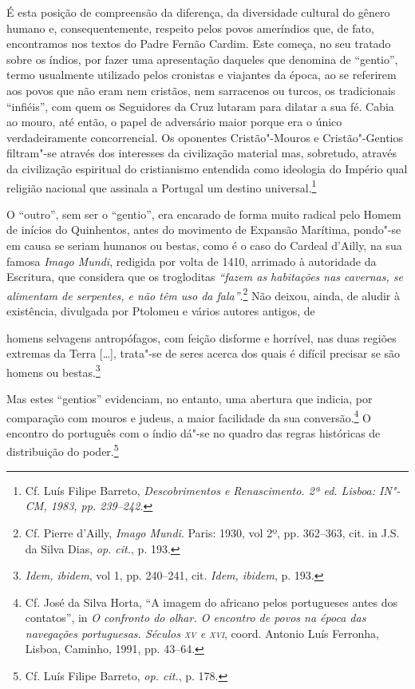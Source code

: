É esta posição de compreensão da diferença, da diversidade cultural
do gênero humano e, consequentemente, respeito pelos povos ameríndios
que, de fato, encontramos nos textos do Padre Fernão Cardim. Este
começa, no seu tratado sobre os índios, por fazer uma
apresentação daqueles que denomina de ``gentio'', termo
usualmente utilizado pelos cronistas e viajantes da época, ao se
referirem aos povos que não eram nem cristãos, nem sarracenos ou
turcos, os tradicionais ``infiéis'', com quem os Seguidores da Cruz
lutaram para dilatar a sua fé. Cabia ao mouro, até então, o papel de
adversário maior porque era o único verdadeiramente concorrencial. Os
oponentes Cristão"-Mouros e Cristão"-Gentios filtram"-se
através dos interesses da civilização material mas, sobretudo, através
da civilização espiritual do cristianismo entendida como ideologia do
Império qual religião nacional que assinala a Portugal um
destino universal.\footnote{ Cf. Luís Filipe Barreto,
\textit{Descobrimentos e Renascimento. 2ª ed. Lisboa: IN"-CM, 1983, pp. 239--242.}} 

 O ``outro'', sem ser o ``gentio'', era encarado de forma muito
radical pelo Homem de inícios do Quinhentos, antes do movimento
de Expansão Marítima, pondo"-se em causa se seriam humanos ou bestas,
como é o caso do Cardeal d'Ailly, na sua famosa \textit{Imago Mundi}, 
redigida por volta de 1410, arrimado à autoridade da Escritura, que 
considera que os trogloditas \textit{``fazem as habitações nas cavernas, se
alimentam de serpentes, e não têm uso da fala''}.\footnote{ Cf. Pierre 
d'Ailly, \textit{Imago Mundi}. Paris: 1930, vol 2º, pp. 362--363, cit. in J.S. da Silva Dias,
\textit{op. cit.}, p. 193.} Não deixou, ainda, de aludir à
existência, divulgada por Ptolomeu e vários autores antigos, de

\begin{hedraquote}
[\ldots{}] homens selvagens antropófagos, com feição disforme e horrível,
nas duas regiões extremas da Terra [\ldots{}], trata"-se de seres acerca dos
quais é difícil precisar se são homens ou bestas.\footnote{ \textit{Idem, ibidem}, 
vol 1, pp. 240--241, cit. \textit{Idem, ibidem}, p. 193.} 
\end{hedraquote}

Mas estes ``gentios'' evidenciam, no entanto, uma
abertura que indicia, por comparação com mouros e judeus, a maior
facilidade da sua conversão.\footnote{ Cf. José da Silva Horta, 
``A imagem do africano pelos portugueses antes dos contatos'', in
\textit{O confronto do olhar. O encontro de povos na época das
navegações portuguesas. Séculos \textsc{xv} e \textsc{xvi}}, coord. Antonio Luís Ferronha,
Lisboa, Caminho, 1991, pp. 43--64.} O encontro do português com o índio
dá"-se no quadro das regras históricas de distribuição do 
poder.\footnote{ Cf. Luís Filipe Barreto, \textit{op. cit.}, p. 178.}

